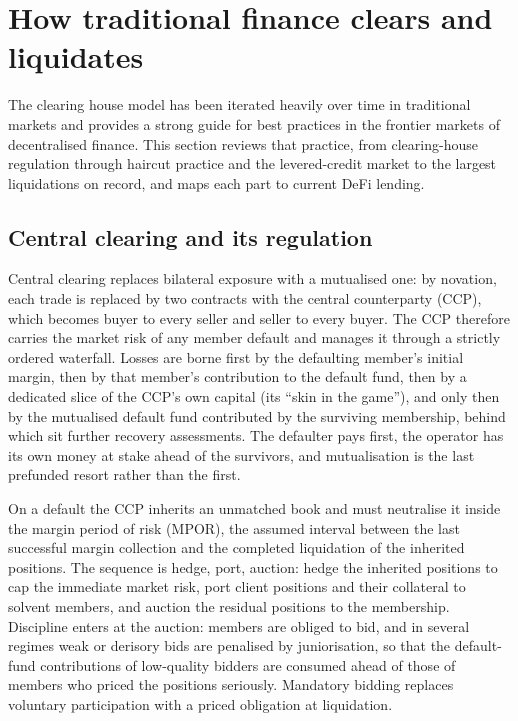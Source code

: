 \documentclass[11pt,a4paper]{article}
\begin{document}
\section{How traditional finance clears and liquidates}\label{sec:tradfi}

The clearing house model has been iterated heavily over time in traditional markets and provides a strong guide for best practices in the frontier markets of decentralised finance. This section reviews that practice, from clearing-house regulation through haircut practice and the levered-credit market to the largest liquidations on record, and maps each part to current DeFi lending.

\subsection{Central clearing and its regulation}

Central clearing replaces bilateral exposure with a mutualised one: by novation, each trade is replaced by two contracts with the central counterparty (CCP), which becomes buyer to every seller and seller to every buyer. The CCP therefore carries the market risk of any member default and manages it through a strictly ordered waterfall. Losses are borne first by the defaulting member's initial margin, then by that member's contribution to the default fund, then by a dedicated slice of the CCP's own capital (its ``skin in the game''), and only then by the mutualised default fund contributed by the surviving membership, behind which sit further recovery assessments. The defaulter pays first, the operator has its own money at stake ahead of the survivors, and mutualisation is the last prefunded resort rather than the first.

On a default the CCP inherits an unmatched book and must neutralise it inside the margin period of risk (MPOR), the assumed interval between the last successful margin collection and the completed liquidation of the inherited positions. The sequence is hedge, port, auction: hedge the inherited positions to cap the immediate market risk, port client positions and their collateral to solvent members, and auction the residual positions to the membership. Discipline enters at the auction: members are obliged to bid, and in several regimes weak or derisory bids are penalised by juniorisation, so that the default-fund contributions of low-quality bidders are consumed ahead of those of members who priced the positions seriously. Mandatory bidding replaces voluntary participation with a priced obligation at liquidation.
\end{document}
